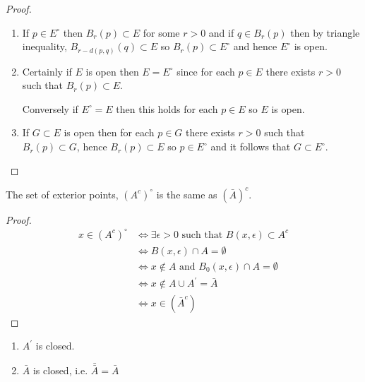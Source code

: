 \begin{proof} \
\begin{enumerate}[label=(\arabic*)]
\item If $p\in E^\circ$ then $B_r(p)\subset E$ for some $r>0$ and if $q\in B_r(p)$ then by triangle inequality, $B_{r-d(p, q)}(q)\subset E$ so $B_r(p)\subset E^\circ$ and
hence $E^\circ$ is open.

\item Certainly if $E$ is open then $E=E^\circ$ since for each $p\in E$ there exists $r>0$ such that $B_r(p)\subset E$.

Conversely if $E^\circ=E$ then this holds for each $p\in E$ so $E$ is open.

\item If $G\subset E$ is open then for each $p\in G$ there exists $r>0$ such that
$B_r(p)\subset G$, hence $B_r(p)\subset E$ so $p\in E^\circ$ and it follows that $G\subset E^\circ$.
\end{enumerate}
\end{proof}

\begin{proposition}
The set of exterior points, $(A^c)^\circ$ is the same as $(\bar{A})^c$.
\end{proposition}

\begin{proof}
\begin{align*}
x \in (A^c)^\circ 
&\iff \exists \epsilon>0 \text{ such that } B(x,\epsilon) \subset A^c \\
&\iff B(x,\epsilon) \cap A = \emptyset \\
&\iff x \notin A \text{ and } B_0(x,\epsilon) \cap A=\emptyset \\
&\iff x \notin A \cup A^\prime = \bar A \\
&\iff x \in (\bar A^c)
\end{align*}
\end{proof}

\begin{proposition}
\begin{enumerate}[label=(\arabic*)]
\item $A^\prime$ is closed.
\item $\bar{A}$ is closed, i.e. $\bar{\bar{A}}=\bar{A}$
\end{enumerate}
\end{proposition}

